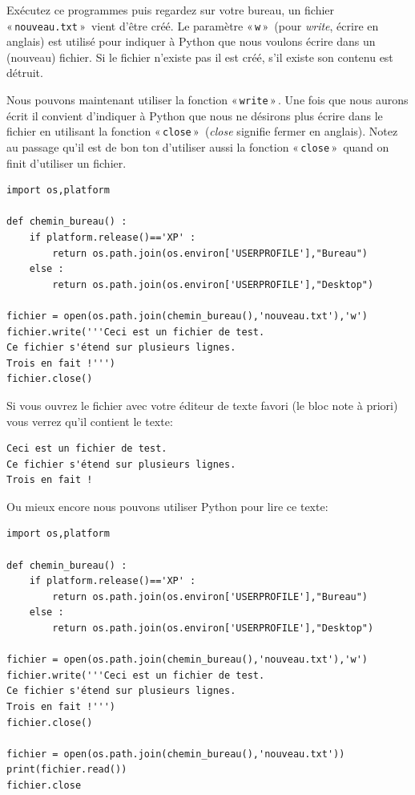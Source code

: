 Exécutez ce programmes puis regardez sur votre bureau, un fichier « \texttt{nouveau.txt} »  vient d'être créé. Le paramètre « \texttt{w} »  (pour \emph{write}, écrire en anglais) est utilisé pour indiquer à Python que nous voulons écrire dans un (nouveau) fichier. Si le fichier n'existe pas il est créé, s'il existe son contenu est détruit.

Nous pouvons maintenant utiliser la fonction « \texttt{write} » . Une fois que nous aurons écrit il convient d'indiquer à Python que nous ne désirons plus écrire dans le fichier en utilisant la fonction « \texttt{close} »  (\emph{close} signifie fermer en anglais). Notez au passage qu'il est de bon ton d'utiliser aussi la fonction « \texttt{close} »  quand on finit d'utiliser un fichier.
 
\begin{Verbatim}[frame=single,rulecolor=\color{mbleu}, label=à taper par exemple en reprenant l'existant]
import os,platform

def chemin_bureau() :
    if platform.release()=='XP' :
        return os.path.join(os.environ['USERPROFILE'],"Bureau")
    else :
        return os.path.join(os.environ['USERPROFILE'],"Desktop")
    
fichier = open(os.path.join(chemin_bureau(),'nouveau.txt'),'w')
fichier.write('''Ceci est un fichier de test.
Ce fichier s'étend sur plusieurs lignes.
Trois en fait !''')
fichier.close()
\end{Verbatim}

Si vous ouvrez le fichier avec votre éditeur de texte favori (le bloc note à priori) vous verrez qu'il contient le texte:

\begin{Verbatim}[frame=single,rulecolor=\color{gray}, label=contenu de nouveau.txt]
Ceci est un fichier de test.
Ce fichier s'étend sur plusieurs lignes.
Trois en fait !
\end{Verbatim}

Ou mieux encore nous pouvons utiliser Python pour lire ce texte:

\begin{Verbatim}[frame=single,rulecolor=\color{mbleu}, label=à taper par exemple en reprenant l'existant]
import os,platform

def chemin_bureau() :
    if platform.release()=='XP' :
        return os.path.join(os.environ['USERPROFILE'],"Bureau")
    else :
        return os.path.join(os.environ['USERPROFILE'],"Desktop")
    
fichier = open(os.path.join(chemin_bureau(),'nouveau.txt'),'w')
fichier.write('''Ceci est un fichier de test.
Ce fichier s'étend sur plusieurs lignes.
Trois en fait !''')
fichier.close()

fichier = open(os.path.join(chemin_bureau(),'nouveau.txt'))
print(fichier.read())
fichier.close
\end{Verbatim}

